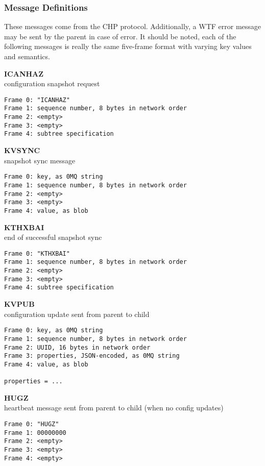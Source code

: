 \subsubsection{Message Definitions}

These messages come from the CHP protocol. Additionally, a WTF error message may be sent by the parent in case of error.
It should be noted, each of the following messages is really the same five-frame format with varying key values and
semantics.

\textbf{ICANHAZ} \\
configuration snapshot request

\begin{lstlisting}
Frame 0: "ICANHAZ"
Frame 1: sequence number, 8 bytes in network order
Frame 2: <empty>
Frame 3: <empty>
Frame 4: subtree specification
\end{lstlisting}

\textbf{KVSYNC} \\
snapshot sync message

\begin{lstlisting}
Frame 0: key, as 0MQ string
Frame 1: sequence number, 8 bytes in network order
Frame 2: <empty>
Frame 3: <empty>
Frame 4: value, as blob
\end{lstlisting}

\textbf{KTHXBAI} \\
end of successful snapshot sync

\begin{lstlisting}
Frame 0: "KTHXBAI"
Frame 1: sequence number, 8 bytes in network order
Frame 2: <empty>
Frame 3: <empty>
Frame 4: subtree specification
\end{lstlisting}

\textbf{KVPUB} \\
configuration update sent from parent to child

\begin{lstlisting}
Frame 0: key, as 0MQ string
Frame 1: sequence number, 8 bytes in network order
Frame 2: UUID, 16 bytes in network order
Frame 3: properties, JSON-encoded, as 0MQ string
Frame 4: value, as blob

properties = ...
\end{lstlisting}

\textbf{HUGZ} \\
heartbeat message sent from parent to child (when no config updates)

\begin{lstlisting}
Frame 0: "HUGZ"
Frame 1: 00000000
Frame 2: <empty>
Frame 3: <empty>
Frame 4: <empty>
\end{lstlisting}
